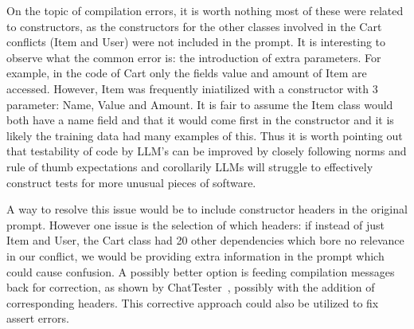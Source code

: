 On the topic of compilation errors, it is worth nothing most of these were related to constructors, as the constructors
for the other classes involved in the Cart conflicts (Item and User) were not included in the prompt. It is interesting
to observe what the common error is: the introduction of extra parameters. For example, in the code of Cart only the fields
value and amount of Item are accessed. However, Item was frequently iniatilized with a constructor with 3 parameter: Name,
Value and Amount. It is fair to assume the Item class would both have a name field and that it would come first in the constructor
and it is likely the training data had many examples of this. Thus it is worth pointing out that testability of code by LLM's can be
improved by closely following norms and rule of thumb expectations and corollarily LLMs will struggle to effectively construct tests
for more unusual pieces of software.

A way to resolve this issue would be to include constructor headers in the original prompt. However one issue is the selection of which
headers: if instead of just Item and User, the Cart class had 20 other dependencies which bore no relevance in our conflict, we would be 
providing extra information in the prompt which could cause confusion. A possibly better option is feeding compilation messages back for correction,
as shown by ChatTester~\cite{kn:chattester}, possibly with the addition of corresponding headers. This corrective approach could also be utilized
to fix assert errors.

